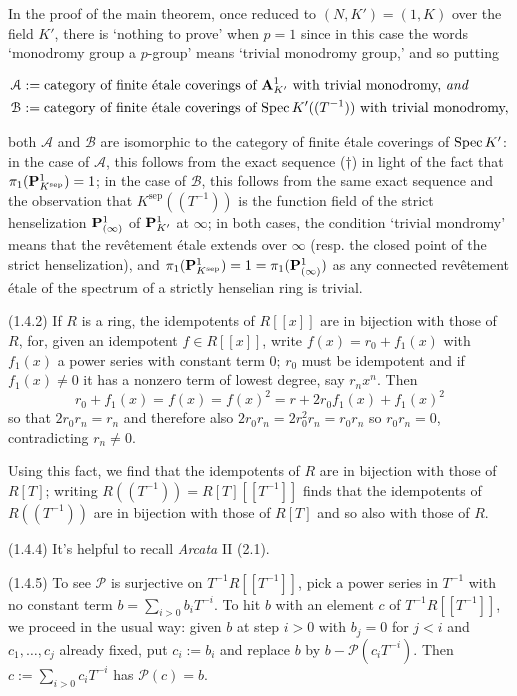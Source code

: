 \documentclass[deligne.tex]{subfiles}
\begin{document}
In the proof of the main theorem, once reduced to $(N,K')=(1,K)$ over the
field $K'$, there is `nothing to prove' when $p=1$ since in this case the
words `monodromy group a $p$-group' means `trivial monodromy group,' and
so putting
\begin{ceqn}\begin{align*}
&\mathcal A := \text{category of finite étale coverings of $\mathbf{A}^1_{K'}$ 
with trivial monodromy, \emph{and}} \\
&\mathcal B := \text{category of finite étale coverings of
$\operatorname{Spec} K'((T^{-1}))$ with trivial monodromy,}
\end{align*}\end{ceqn}
both $\mathcal A$ and $\mathcal B$ are isomorphic to the category of
finite étale coverings of $\operatorname{Spec} K'$: in the case of $\mathcal A$, this 
follows from the exact sequence ($\dagger$) in light of the fact that
$\pi_1(\mathbf{P}^1_{K^{\mathrm{sep}}})=1$;
in the case of $\mathcal B$, this follows from the same exact sequence and
the observation that $K^{\mathrm{sep}}((T^{-1}))$ is the function field of
the strict henselization $\mathbf{P}^1_{(\infty)}$ of $\mathbf{P}^1_{K'}$ at $\infty$; in
both cases, the condition `trivial mondromy' means that the revêtement
étale extends over $\infty$
(resp. the closed point of the strict henselization), and
$\pi_1(\mathbf{P}^1_{K^{\mathrm{sep}}})=1=\pi_1(\mathbf{P}^1_{(\infty)})$ as any
connected revêtement étale of the spectrum of a strictly henselian ring is 
trivial.

(1.4.2) If $R$ is a ring, the idempotents of $R[[x]]$ are in bijection with
those of $R$, for, given an idempotent $f\in R[[x]]$, write 
$f(x)=r_0+f_1(x)$ with $f_1(x)$ a power series with constant term 0;
$r_0$ must be idempotent and if $f_1(x)\ne0$ it has a nonzero term of
lowest degree, say $r_nx^n$. Then
\begin{equation*}
	r_0+f_1(x)=f(x)=f(x)^2=r+2r_0f_1(x)+f_1(x)^2
\end{equation*}
so that $2r_0r_n=r_n$ and therefore also $2r_0r_n=2r_0^2r_n=r_0r_n$ so
$r_0r_n=0$, contradicting $r_n\ne0$.

Using this fact, we find that the idempotents of $R$ are in bijection with
those of $R[T]$; writing $R((T^{-1}))=R[T][[T^{-1}]]$ finds that the 
idempotents of $R((T^{-1}))$ are in bijection with those of $R[T]$ and so
also with those of $R$.

(1.4.4) It's helpful to recall \emph{Arcata} II (2.1).

(1.4.5) To see $\mathscr P$ is surjective on $T^{-1}R[[T^{-1}]]$, pick a
power series in $T^{-1}$ with no constant term $b=\sum_{i>0}b_iT^{-i}$.
To hit $b$ with an element $c$ of $T^{-1}R[[T^{-1}]]$, we proceed in the
usual way: given $b$ at step $i>0$ with $b_j=0$ for $j<i$ and 
$c_1,\ldots,c_j$ already fixed, put $c_i:=b_i$ and replace $b$ by
$b-\mathscr P(c_iT^{-i})$. Then $c:=\sum_{i>0}c_iT^{-i}$ has
$\mathscr P(c)=b$.
\end{document}
